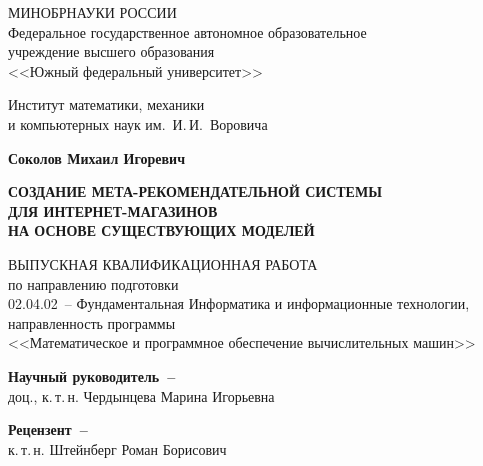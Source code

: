 


\thispagestyle{empty}
\begin{singlespacing} 
\begin{center}

МИНОБРНАУКИ РОССИИ\\ [12pt]
Федеральное государственное автономное образовательное\\
учреждение высшего образования\\
<<Южный федеральный университет>>

\vspace{\baselineskip}
Институт математики, механики\\
и компьютерных наук им.~И.\,И.~Воровича


\vfill
\textbf{Соколов Михаил Игоревич}

\vspace{15mm}
{\bf СОЗДАНИЕ МЕТА-РЕКОМЕНДАТЕЛЬНОЙ СИСТЕМЫ \\
ДЛЯ ИНТЕРНЕТ-МАГАЗИНОВ \\
НА ОСНОВЕ СУЩЕСТВУЮЩИХ МОДЕЛЕЙ }

\vspace{15mm}
ВЫПУСКНАЯ КВАЛИФИКАЦИОННАЯ РАБОТА\\
по направлению подготовки\\
02.04.02~-- Фундаментальная Информатика и информационные технологии,\\
направленность программы\\
<<Математическое и программное обеспечение вычислительных машин>>

\vspace{10mm}
\textbf{Научный руководитель~--}\\
доц., к.\,т.\,н. Чердынцева Марина Игорьевна

\vspace{7mm}
\textbf{Рецензент~--}\\
к.\,т.\,н. Штейнберг Роман Борисович 



\end{center}
\end{singlespacing}
